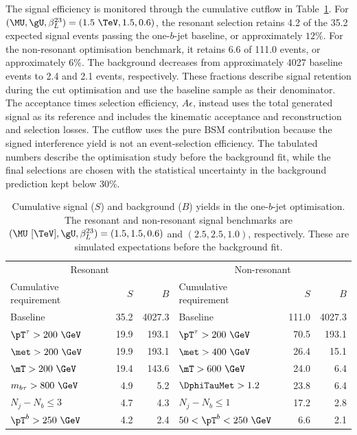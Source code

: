 The signal efficiency is monitored through the cumulative cutflow in Table~\ref{tab:ch7_cutflow}.
For $(\MU,\gU,\beta_L^{23})=(1.5~\TeV,1.5,0.6)$, the resonant selection retains 4.2 of the 35.2 expected signal events passing the one-$b$-jet baseline, or approximately $12\%$.
For the non-resonant optimisation benchmark, it retains 6.6 of 111.0 events, or approximately $6\%$.
The background decreases from approximately 4027 baseline events to 2.4 and 2.1 events, respectively.
These fractions describe signal retention during the cut optimisation and use the baseline sample as their denominator.
The acceptance times selection efficiency, $A\epsilon$, instead uses the total generated signal as its reference and includes the kinematic acceptance and reconstruction and selection losses.
The cutflow uses the pure BSM contribution because the signed interference yield is not an event-selection efficiency.
The tabulated numbers describe the optimisation study before the background fit, while the final selections are chosen with the statistical uncertainty in the background prediction kept below $30\%$.

\begin{table}[htbp]
    \centering
    \small
    \caption{Cumulative signal ($S$) and background ($B$) yields in the one-$b$-jet optimisation. The resonant and non-resonant signal benchmarks are $(\MU~[\TeV],\gU,\beta_L^{23})=(1.5,1.5,0.6)$ and $(2.5,2.5,1.0)$, respectively. These are simulated expectations before the background fit.}
    \label{tab:ch7_cutflow}
    \begin{tabular}{lrrlrr}
        \toprule
        \multicolumn{3}{c}{Resonant} & \multicolumn{3}{c}{Non-resonant} \\
        Cumulative requirement & $S$ & $B$ & Cumulative requirement & $S$ & $B$ \\
        \midrule
        Baseline & 35.2 & 4027.3 & Baseline & 111.0 & 4027.3 \\
        $\pT^\tau>200~\GeV$ & 19.9 & 193.1 & $\pT^\tau>200~\GeV$ & 70.5 & 193.1 \\
        $\met>200~\GeV$ & 19.9 & 193.1 & $\met>400~\GeV$ & 26.4 & 15.1 \\
        $\mT>200~\GeV$ & 19.4 & 143.6 & $\mT>600~\GeV$ & 24.0 & 6.4 \\
        $m_{b\tau}>800~\GeV$ & 4.9 & 5.2 & $\DphiTauMet>1.2$ & 23.8 & 6.4 \\
        $N_j-N_b\leq3$ & 4.7 & 4.3 & $N_j-N_b\leq1$ & 17.2 & 2.8 \\
        $\pT^b>250~\GeV$ & 4.2 & 2.4 & $50<\pT^b<250~\GeV$ & 6.6 & 2.1 \\
        \bottomrule
    \end{tabular}
\end{table}

